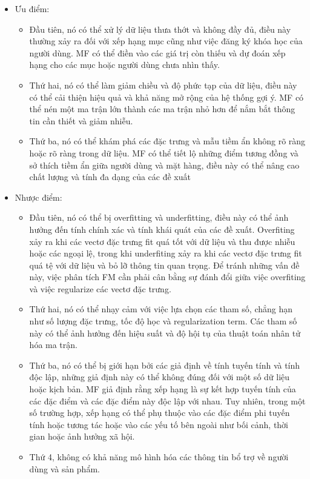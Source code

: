 \begin{itemize}
    \item Ưu điểm:
    \begin{itemize}
        \item Đầu tiên, nó có thể xử lý dữ liệu thưa thớt và không đầy đủ, điều này thường xảy ra đối với xếp hạng mục cũng như việc đăng ký khóa học của người dùng. MF có thể điền vào các giá trị còn thiếu và dự đoán xếp hạng cho các mục hoặc người dùng chưa nhìn thấy.
        \item Thứ hai, nó có thể làm giảm chiều và độ phức tạp của dữ liệu, điều này có thể cải thiện hiệu quả và khả năng mở rộng của hệ thống gợi ý. MF có thể nén một ma trận lớn thành các ma trận nhỏ hơn để nắm bắt thông tin cần thiết và giảm nhiễu. 
        \item Thứ ba, nó có thể khám phá các đặc trưng và mẫu tiềm ẩn không rõ ràng hoặc rõ ràng trong dữ liệu. MF có thể tiết lộ những điểm tương đồng và sở thích tiềm ẩn giữa người dùng và mặt hàng, điều này có thể nâng cao chất lượng và tính đa dạng của các đề xuất
    \end{itemize}
    \item Nhược điểm:
    \begin{itemize}
        \item Đầu tiên, nó có thể bị overfitting và underfitting, điều này có thể ảnh hưởng đến tính chính xác và tính khái quát của các đề xuất. Overfiting xảy ra khi các vectơ đặc trưng fit quá tốt với dữ liệu và thu được nhiễu hoặc các ngoại lệ, trong khi underfiting xảy ra khi các vectơ đặc trưng fit quá tệ với dữ liệu và bỏ lỡ thông tin quan trọng. Để tránh những vấn đề này, việc phân tích FM cần phải cân bằng sự đánh đổi giữa việc overfiting và việc regularize các vectơ đặc trưng.
        \item Thứ hai, nó có thể nhạy cảm với việc lựa chọn các tham số, chẳng hạn như số lượng đặc trưng, tốc độ học và regularization term. Các tham số này có thể ảnh hưởng đến hiệu suất và độ hội tụ của thuật toán nhân tử hóa ma trận.
        \item Thứ ba, nó có thể bị giới hạn bởi các giả định về tính tuyến tính và tính độc lập, những giả định này có thể không đúng đối với một số dữ liệu hoặc kịch bản. MF giả định rằng xếp hạng là sự kết hợp tuyến tính của các đặc điểm và các đặc điểm này độc lập với nhau. Tuy nhiên, trong một số trường hợp, xếp hạng có thể phụ thuộc vào các đặc điểm phi tuyến tính hoặc tương tác hoặc vào các yếu tố bên ngoài như bối cảnh, thời gian hoặc ảnh hưởng xã hội.
        \item Thứ 4, không có khả năng mô hình hóa các thông tin bổ trợ về người dùng và sản phẩm.
    \end{itemize}
\end{itemize}
